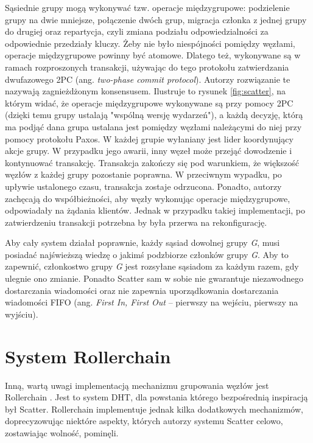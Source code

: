 \documentclass[12pt, twoside, openany]{report}
\begin{document}
Sąsiednie grupy mogą wykonywać tzw. operacje międzygrupowe: podzielenie grupy na dwie mniejsze, połączenie dwóch grup, migracja członka z jednej grupy do drugiej oraz repartycja, czyli zmiana podziału odpowiedzialności za odpowiednie przedziały kluczy. Żeby nie było niespójności pomiędzy węzłami, operacje międzygrupowe powinny być atomowe. Dlatego też, wykonywane są w ramach rozproszonych transakcji, używając do tego protokołu zatwierdzania dwufazowego 2PC (ang. \textit{two-phase commit protocol}). Autorzy rozwiązanie te nazywają zagnieżdżonym konsensusem. Ilustruje to rysunek \ref{fig:scatter}, na którym widać, że operacje międzygrupowe wykonywane są przy pomocy 2PC (dzięki temu grupy ustalają "wspólną wersję wydarzeń"), a każdą decyzję, którą ma podjąć dana grupa ustalana jest pomiędzy węzłami należącymi do niej przy pomocy protokołu Paxos. W każdej grupie wyłaniany jest lider koordynujący akcje grupy. W przypadku jego awarii, inny węzeł może przejąć dowodzenie i kontynuować transakcję. Transakcja zakończy się pod warunkiem, że większość węzłów z każdej grupy pozostanie poprawna. W przeciwnym wypadku, po upływie ustalonego czasu, transakcja zostaje odrzucona. Ponadto, autorzy zachęcają do współbieżności, aby węzły wykonując operacje międzygrupowe, odpowiadały na żądania klientów. Jednak w przypadku takiej implementacji, po zatwierdzeniu transakcji potrzebna by była przerwa na rekonfigurację.

Aby cały system działał poprawnie, każdy sąsiad dowolnej grupy \textit{G}, musi posiadać najświeższą wiedzę o jakimś podzbiorze członków grupy \textit{G}. Aby to zapewnić, członkostwo grupy \textit{G} jest rozsyłane sąsiadom za każdym razem, gdy ulegnie ono zmianie. Ponadto Scatter sam w sobie nie gwarantuje niezawodnego dostarczania wiadomości oraz nie zapewnia uporządkowania dostarczania wiadomości FIFO (ang. \textit{First In, First Out} – pierwszy na wejściu, pierwszy na wyjściu).

\section{System Rollerchain}
\label{subch_rollerchain}

Inną, wartą uwagi implementacją mechanizmu grupowania węzłów jest Rollerchain \cite{bib:rollerchain}. Jest to system DHT, dla powstania którego bezpośrednią inspiracją był Scatter. Rollerchain implementuje jednak kilka dodatkowych mechanizmów, doprecyzowując niektóre aspekty, których autorzy systemu Scatter celowo, zostawiając wolność, pominęli.
\end{document}
